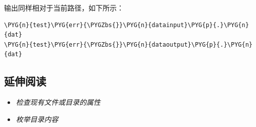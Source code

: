 
输出同样相对于当前路径，如下所示：



\begin{codeblockbg}
\begin{Verbatim}[commandchars=\\\{\},breaklines=true,breakanywhere=true,fontsize=\codefont,xleftmargin=17bp]
\PYG{n}{test}\PYG{err}{\PYGZbs{}}\PYG{n}{datainput}\PYG{p}{.}\PYG{n}{dat}
\PYG{n}{test}\PYG{err}{\PYGZbs{}}\PYG{n}{dataoutput}\PYG{p}{.}\PYG{n}{dat}
\end{Verbatim}
\end{codeblockbg}



\subsection{延伸阅读}



\begin{itemize}
\item \textit{检查现有文件或目录的属性}



\item \textit{枚举目录内容}

\end{itemize}
